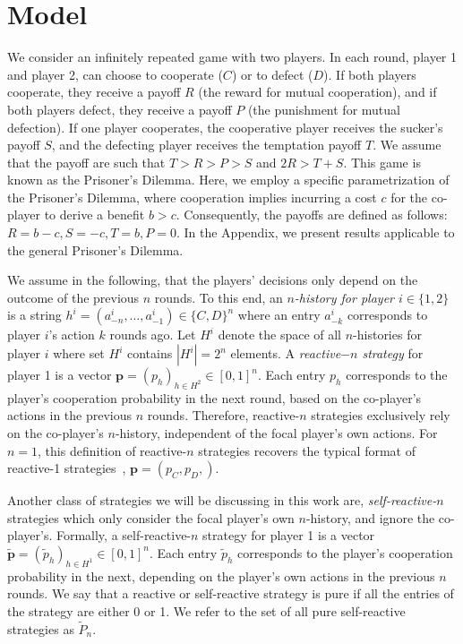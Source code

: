 \documentclass{article}
\theoremstyle{definition}
\begin{document}
\section{Model}

We consider an infinitely repeated game with two players. In each round, player 1
and player 2, can choose to cooperate ($C$) or to defect ($D$). If both players
cooperate, they receive a payoff $R$ (the reward for mutual cooperation), and if
both players defect, they receive a payoff $P$ (the punishment for mutual
defection). If one player cooperates, the cooperative player receives the
sucker's payoff $S$, and the defecting player receives the temptation payoff
$T$. We assume that the payoff are such that $T > R > P > S$ and $2 R > T + S$.
This game is known as the Prisoner's Dilemma. Here, we
employ a specific parametrization of the Prisoner's Dilemma, where cooperation
implies incurring a cost $c$ for the co-player to derive a benefit $b > c$.
Consequently, the payoffs are defined as follows: \(R = b - c, S = -c, T = b, P =
0\). In the Appendix, we present results applicable to the general Prisoner's
Dilemma.

We assume in the following, that the players' decisions only depend on the
outcome of the previous $n$ rounds. To this end, an {\it $n$-history for player
$i \in \{1, 2\}$} is a string $h^i=(a^i_{-n},\ldots,a^i_{-1})\!\in\!\{C,D\}^n$
where an entry $a^i_{-k}$ corresponds to player $i$'s action $k$ rounds ago. Let
$H^i$ denote the space of all $n$-histories for player $i$ where set $H^i$ contains
$|H^i|=2^{n}$ elements. A {\it reactive$-n$ strategy} for player 1 is a vector
$\mathbf{p}=(p_h)_{h\in H^2} \in [0, 1]^{n}$. Each entry $p_h$ corresponds to
the player's cooperation probability in the next round, based on the co-player's
actions in the previous $n$ rounds. Therefore, reactive-$n$ strategies
exclusively rely on the co-player's $n$-history, independent of the focal
player's own actions. For \(n=1\), this definition of reactive-\(n\) strategies
recovers the typical format of reactive-1 strategies~\citep{baek:scientific:2016, wahl:JTB:1999, mcavoy:PRSA:2019},
\(\mathbf{p}=(p_C, p_D,)\).

Another class of strategies we will be discussing in this work are, {\it
self-reactive-$n$} strategies which only consider the focal player's own
$n$-history, and ignore the co-player's. Formally, a self-reactive-$n$ strategy
for player 1 is a vector $\mathbf{\tilde{p}} = (\tilde{p}_h)_{h \in H^1} \in [0,
1] ^ {n}$. Each entry $\tilde{p}_h$ corresponds to the player's cooperation
probability in the next, depending on the player's own actions in the previous
$n$ rounds. We say that a reactive or self-reactive strategy is pure if all the
entries of the strategy are either 0 or 1. We refer to the set of all pure
self-reactive strategies as $\tilde{P}_n$.
\end{document}
